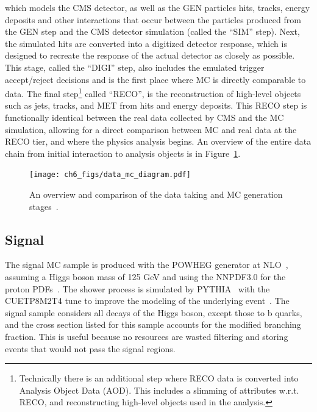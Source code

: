 which models the CMS detector, as well as the GEN particles hits, tracks, energy deposits and other interactions that occur
between the particles produced from the GEN step and the CMS detector simulation (called the ``SIM'' step). Next, the simulated
hits are converted into a digitized detector response, which is designed to recreate the response of the actual detector as
closely as possible. This stage, called the ``DIGI'' step, also includes the emulated trigger accept/reject decisions and is the
first place where MC is directly comparable to data. The final step\footnote{Technically there is an additional step where RECO data
is converted into Analysis Object Data (AOD). This includes a slimming of attributes w.r.t. RECO, and reconstructing high-level objects
used in the analysis.} called ``RECO'', is the reconstruction of high-level objects such as jets, tracks, and MET from hits and
energy deposits. This RECO step is functionally identical between the real data collected by CMS and the MC simulation, allowing
for a direct comparison between MC and real data at the RECO tier, and where the physics analysis begins. An overview of the entire
data chain from initial interaction to analysis objects is in Figure~\ref{fig:data_mc_chain}.

\begin{figure}[hbtp]
 \begin{center}
   \texttt{[image: ch6\_figs/data\_mc\_diagram.pdf]}
   \caption[Diagram comparing data taking and MC generation stages]{An overview and comparison of the data taking and MC generation stages~\cite{cms_pflow_img}.}
   \label{fig:data_mc_chain}
 \end{center}
\end{figure}

\subsection{Signal}
The signal MC sample is produced with the \textsc{POWHEG} generator at NLO~\cite{powheg}, assuming a Higgs boson mass of 125 GeV and using the \textsc{NNPDF3.0} for the proton
PDFs~\cite{nnpdf3}. The shower process is simulated by \textsc{PYTHIA}~\cite{pythia} with the \textsc{CUETP8M2T4} tune to improve the modeling of the underlying event~\cite{CUETP8M2T4}. 
The signal sample considers all decays of the Higgs boson, except those to b quarks, and the cross section listed for this sample accounts for the modified branching fraction.
This is useful because no resources are wasted filtering and storing events that would not pass the signal regions. 

